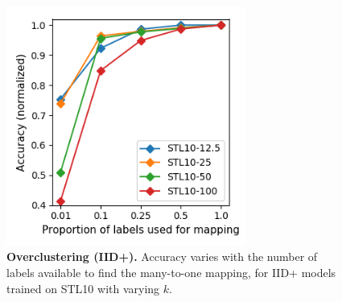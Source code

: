 \begin{figure}[h]
\centering
\includegraphics[width=0.7\textwidth]{experiments2_files/render_vary_num_labels_stl.png}
\caption{\textbf{Overclustering (IID+).} Accuracy varies with the number of labels available to find the many-to-one mapping, for IID+ models trained on STL10 with varying $k$.} \label{f:iid_plus_num_labels_stl}
\end{figure}